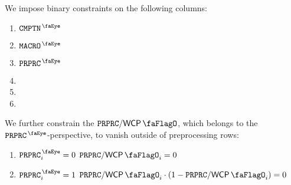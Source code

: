 We impose binary constraints on the following columns:
\begin{multicols}{2}
	\begin{enumerate}
		\item $\isComputation$
		\item $\isMacro$
		\item $\isPreprocessing$
		\item \isExpLog{}
		\item \isModexpLog{}
		\item[\vspace{\fill}]
	\end{enumerate}
\end{multicols}
We further constrain the $\ppWcpFlag$, which belongs to the $\isPreprocessing$-perspective, to vanish outside of preprocessing rows:
\begin{enumerate}[resume]
        \item \If $\isPreprocessing_{i} = 0$ \Then $\ppWcpFlag_{i} = 0$
	\item \If $\isPreprocessing_{i} = 1$ \Then $\ppWcpFlag_{i} \cdot (1 - \ppWcpFlag_{i}) = 0$
\end{enumerate}
